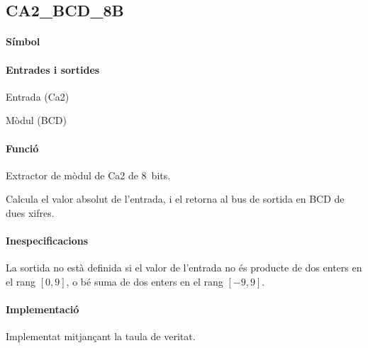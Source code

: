 \subsection{\label{sub:\projectname-CA2_BCD_8B} \textsf{CA2\_BCD\_8B}}

\paragraph{Símbol}

\begin{center}  \end{center}

\paragraph{Entrades i sortides}

\begin{where}
\item[\nodenamerange{CA2}{7}{0}] Entrada (Ca2)
\item[\nodenamerange{BCD}{7}{0}] Mòdul (BCD)
\end{where}

\paragraph{Funció}

Extractor de mòdul de Ca2 de 8~bits.

Calcula el valor absolut de l'entrada, i el retorna al bus de sortida en BCD de dues xifres.

\paragraph{Inespecificacions}


La sortida no està definida si el valor de l'entrada no és producte de dos
enters en el rang $\left[0, 9\right]$, o bé suma de dos enters en el rang
$\left[-9, 9\right]$.


\paragraph{Implementació}




Implementat mitjançant la taula de veritat.

\vspace{1cm}
